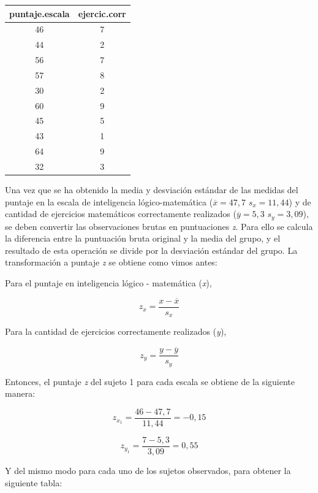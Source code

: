\documentclass[]{book}
\begin{document}
\begin{longtable}[]{@{}cc@{}}
\toprule
puntaje.escala & ejercic.corr\tabularnewline
\midrule
\endhead
46 & 7\tabularnewline
44 & 2\tabularnewline
56 & 7\tabularnewline
57 & 8\tabularnewline
30 & 2\tabularnewline
60 & 9\tabularnewline
45 & 5\tabularnewline
43 & 1\tabularnewline
64 & 9\tabularnewline
32 & 3\tabularnewline
\bottomrule
\end{longtable}

Una vez que se ha obtenido la media y desviación estándar de las medidas
del puntaje en la escala de inteligencia lógico-matemática
(\(\overline{x} = 47,7\) \(s_{x} = 11,44\)) y de cantidad de ejercicios
matemáticos correctamente realizados
(\(\overline{y} = 5,3\) \(s_{y} = 3,09\)), se deben convertir las
observaciones brutas en puntuaciones \emph{z}. Para ello se calcula la
diferencia entre la puntuación bruta original y la media del grupo, y el
resultado de esta operación se divide por la desviación estándar del
grupo. La transformación a puntaje \emph{z} se obtiene como vimos antes:

Para el puntaje en inteligencia lógico - matemática (\emph{x}),

\[z_{x} = \frac{x - \overline{x}}{s_{x}}\]

Para la cantidad de ejercicios correctamente realizados (\emph{y}),

\[z_{y} = \frac{y - \overline{y}}{s_{y}}\]

Entonces, el puntaje \emph{z} del sujeto 1 para cada escala se obtiene de la siguiente manera:

\[z_{x_{1}} = \frac{46 - 47,7}{11,44} = - 0,15\]

\[z_{y_{1}} = \frac{7 - 5,3}{3,09} = 0,55\]

Y del mismo modo para cada uno de los sujetos observados, para obtener la siguiente tabla:
\end{document}
